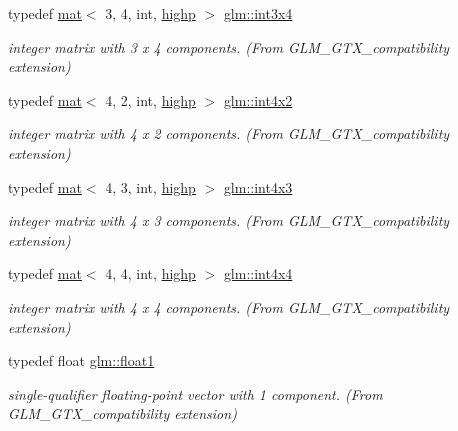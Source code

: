 \begin{DoxyCompactItemize}
typedef \hyperlink{structglm_1_1mat}{mat}$<$ 3, 4, int, \hyperlink{namespaceglm_a36ed105b07c7746804d7fdc7cc90ff25ac6f7eab42eacbb10d59a58e95e362074}{highp} $>$ \hyperlink{group__gtx__compatibility_gaaf72af875fd64f43606aa083d2374195}{glm\+::int3x4}
\begin{DoxyCompactList}\small\item\em integer matrix with 3 x 4 components. (From G\+L\+M\+\_\+\+G\+T\+X\+\_\+compatibility extension) \end{DoxyCompactList}\item 
typedef \hyperlink{structglm_1_1mat}{mat}$<$ 4, 2, int, \hyperlink{namespaceglm_a36ed105b07c7746804d7fdc7cc90ff25ac6f7eab42eacbb10d59a58e95e362074}{highp} $>$ \hyperlink{group__gtx__compatibility_ga217e382844361bca6a376e72efa4b360}{glm\+::int4x2}
\begin{DoxyCompactList}\small\item\em integer matrix with 4 x 2 components. (From G\+L\+M\+\_\+\+G\+T\+X\+\_\+compatibility extension) \end{DoxyCompactList}\item 
typedef \hyperlink{structglm_1_1mat}{mat}$<$ 4, 3, int, \hyperlink{namespaceglm_a36ed105b07c7746804d7fdc7cc90ff25ac6f7eab42eacbb10d59a58e95e362074}{highp} $>$ \hyperlink{group__gtx__compatibility_gadda7ab2670c41cbe997641db23ace3d2}{glm\+::int4x3}
\begin{DoxyCompactList}\small\item\em integer matrix with 4 x 3 components. (From G\+L\+M\+\_\+\+G\+T\+X\+\_\+compatibility extension) \end{DoxyCompactList}\item 
typedef \hyperlink{structglm_1_1mat}{mat}$<$ 4, 4, int, \hyperlink{namespaceglm_a36ed105b07c7746804d7fdc7cc90ff25ac6f7eab42eacbb10d59a58e95e362074}{highp} $>$ \hyperlink{group__gtx__compatibility_ga4f4e5fb81339df0489d802fb9d574fd7}{glm\+::int4x4}
\begin{DoxyCompactList}\small\item\em integer matrix with 4 x 4 components. (From G\+L\+M\+\_\+\+G\+T\+X\+\_\+compatibility extension) \end{DoxyCompactList}\item 
typedef float \hyperlink{group__gtx__compatibility_gae0ad1b0450320cda98bbbecb56bc3167}{glm\+::float1}
\begin{DoxyCompactList}\small\item\em single-\/qualifier floating-\/point vector with 1 component. (From G\+L\+M\+\_\+\+G\+T\+X\+\_\+compatibility extension) \end{DoxyCompactList}\item 

\end{DoxyCompactItemize}
